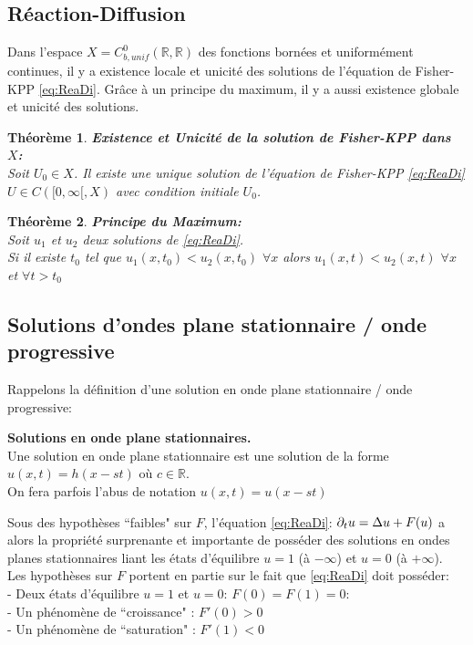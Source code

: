\documentclass[11pt]{article}
\begin{document}
\subsection{Réaction-Diffusion}
Dans l’espace $X=C^0_{b,unif}(\mathbb{R},\mathbb{R})$ des fonctions bornées et uniformément continues, il y a existence locale et unicité des solutions de l’équation de Fisher-KPP \eqref{eq:ReaDi}. Grâce à un principe du maximum, il y a aussi existence globale et unicité des solutions.
\newtheorem{theorem}{Théorème}
\begin{theorem} \textbf{Existence et Unicité de la solution de Fisher-KPP dans $X$:}\\ Soit $U_0 \in X$. Il existe une unique solution de l'équation de Fisher-KPP \eqref{eq:ReaDi}  $U \in C([0,\infty[,X)$ avec condition initiale $U_0$. \end{theorem}
\begin{theorem} \textbf{Principe du Maximum:} \\Soit $u_1$ et $u_2$ deux solutions de \eqref{eq:ReaDi}.\\
 Si il existe $t_0$ tel que $u_1(x,t_0)<u_2(x,t_0) $ $\forall x$ alors $u_1(x,t)<u_2(x,t)$  $ \forall x$ et $\forall t>t_0$ \end{theorem}

\subsection{Solutions d'ondes plane stationnaire / onde progressive}
Rappelons la définition d'une solution en onde plane stationnaire / onde progressive:
\begin{definition}{\textbf{Solutions en onde plane stationnaires.}}\\Une solution en onde plane stationnaire est une solution de la forme $u(x,t)=h(x-st)$ où $c \in \mathbb{R} $.\\ On fera parfois l'abus de notation $u(x,t)=u(x-st)$
\end{definition}
Sous des hypothèses ``faibles" sur $F$, l'équation \eqref{eq:ReaDi}: $\partial_t u = \Delta u + F(u)$ a alors la propriété surprenante et importante de posséder des solutions en ondes planes stationnaires liant les états d'équilibre $u=1$ (à $-\infty$) et $u=0$ (à $+\infty$).\\
Les hypothèses sur $F$ portent en partie sur le fait que \eqref{eq:ReaDi} doit posséder:\\
- Deux états d'équilibre $u=1$ et $u=0$: $F(0)=F(1)=0$:\\
- Un phénomène de ``croissance" : $F'(0)>0$\\
- Un phénomène de ``saturation" : $F'(1)<0$ \\
\end{document}
